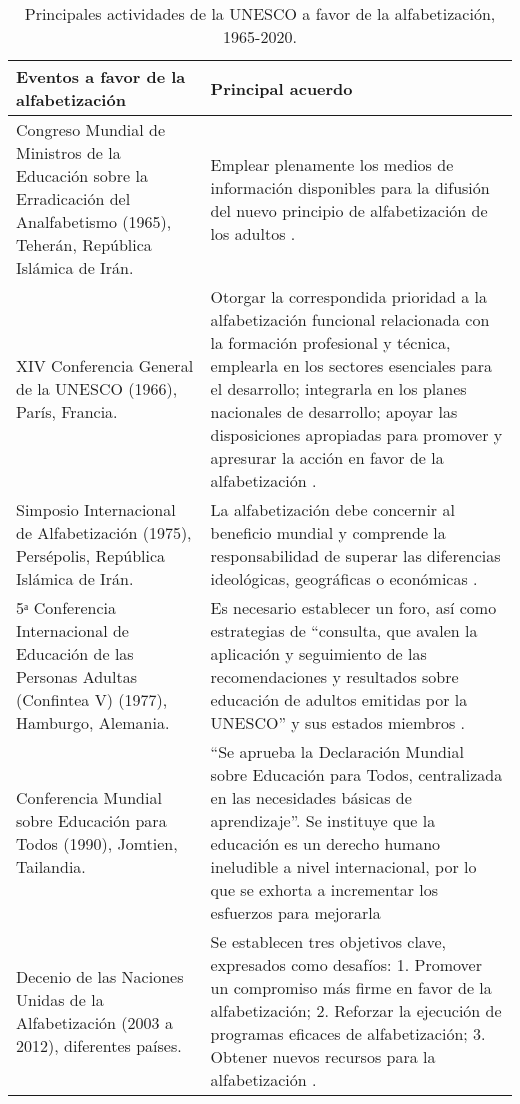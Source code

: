 \documentclass[spanish]{textolivre}
\begin{document}
\newpage
\begin{small}
\begin{longtable}{
    >{\raggedright\arraybackslash}
    p{}
    p{}
    }
\caption{Principales actividades de la UNESCO a favor de la alfabetización, 1965-2020.}
\label{tbl01}
\\
\toprule
Eventos a favor de la alfabetización & Principal acuerdo \\ 
\midrule
\arrayrulecolor[gray]{.7}
Congreso Mundial de Ministros de la Educación sobre la Erradicación del Analfabetismo (1965), Teherán, República Islámica de Irán. &
Emplear plenamente los medios de información disponibles para la difusión del nuevo principio de alfabetización de los adultos \cite{fernandez_1966}. \\
\midrule
XIV Conferencia General de la UNESCO (1966), París, Francia. &
Otorgar la correspondida prioridad a la  alfabetización funcional relacionada con la formación profesional y técnica, emplearla en los sectores esenciales para el desarrollo; integrarla en los planes nacionales de desarrollo; apoyar las disposiciones apropiadas para promover y apresurar la acción en favor de la  alfabetización \cite{unesco_actas_1969}. \\
\midrule
Simposio Internacional de  Alfabetización (1975), Persépolis, República Islámica de Irán. &
La alfabetización debe concernir al beneficio mundial y comprende la responsabilidad de superar las diferencias ideológicas, geográficas o económicas \cite{unesco_consejo_1987}. \\
\midrule
5ᵃ Conferencia Internacional de Educación de las Personas Adultas (Confintea V) (1977), Hamburgo, Alemania. &
Es necesario establecer un foro, así como estrategias de “consulta, que avalen la  aplicación y seguimiento de las recomendaciones y resultados sobre educación de adultos emitidas por la UNESCO” y sus estados miembros \cite[p. 44]{unesco_quinta_1997}. \\
\midrule
Conferencia Mundial sobre Educación para Todos (1990), Jomtien, Tailandia. &
“Se aprueba la Declaración Mundial sobre Educación para Todos, centralizada en las necesidades básicas de aprendizaje”. Se instituye que la educación es un derecho  humano ineludible a nivel internacional, por lo que se exhorta a incrementar los esfuerzos para mejorarla \cite[p. 97]{haggis_conferencia_1992} \\
\midrule
Decenio de las Naciones Unidas de la Alfabetización (2003 a 2012), diferentes países. &
Se establecen tres objetivos clave, expresados como desafíos: 1. Promover un compromiso más firme en favor de la alfabetización; 2. Reforzar la ejecución de programas eficaces de alfabetización; 3. Obtener nuevos recursos para la alfabetización \cite{unesco_decenio_2009}. \\

\end{longtable}
\end{small}
\end{document}
